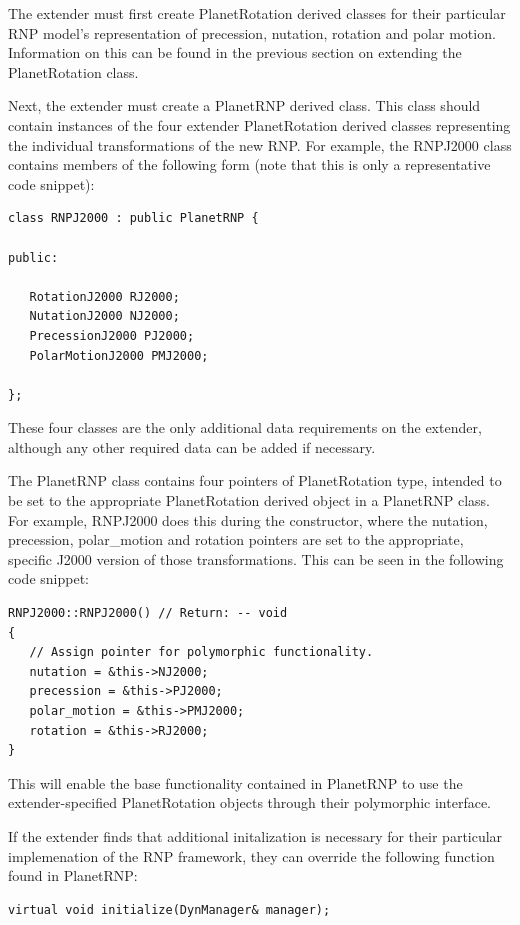 The extender must first create PlanetRotation derived classes for their
particular RNP model's representation of precession, nutation, rotation and
polar motion. Information on this can be found in the previous section
on extending the PlanetRotation class.

Next, the extender must create a PlanetRNP derived class. This class
should contain instances of the four extender PlanetRotation derived classes
representing the individual transformations of the new RNP. For example,
the RNPJ2000 class contains members of the following form (note that this
is only a representative code snippet):

\begin{verbatim}
class RNPJ2000 : public PlanetRNP {

public:

   RotationJ2000 RJ2000;
   NutationJ2000 NJ2000;
   PrecessionJ2000 PJ2000;
   PolarMotionJ2000 PMJ2000;

};
\end{verbatim}

These four classes are the only additional data requirements on the extender,
although any other required data can be added if necessary.

The PlanetRNP class contains four pointers of PlanetRotation type, intended
to be set to the appropriate PlanetRotation derived object in a
PlanetRNP class. For example, RNPJ2000 does this during the constructor,
where the nutation, precession, polar\_motion and rotation pointers are set
to the appropriate, specific J2000 version of those transformations.
This can be seen in the following code snippet:

\begin{verbatim}
RNPJ2000::RNPJ2000() // Return: -- void
{
   // Assign pointer for polymorphic functionality.
   nutation = &this->NJ2000;
   precession = &this->PJ2000;
   polar_motion = &this->PMJ2000;
   rotation = &this->RJ2000;
}
\end{verbatim}

This will enable the base functionality contained in PlanetRNP to use the
extender-specified PlanetRotation objects through their polymorphic interface.

If the extender finds that additional initalization is necessary for their
particular implemenation of the RNP framework, they can override the following
function found in PlanetRNP:

\begin{verbatim}
virtual void initialize(DynManager& manager);
\end{verbatim}

